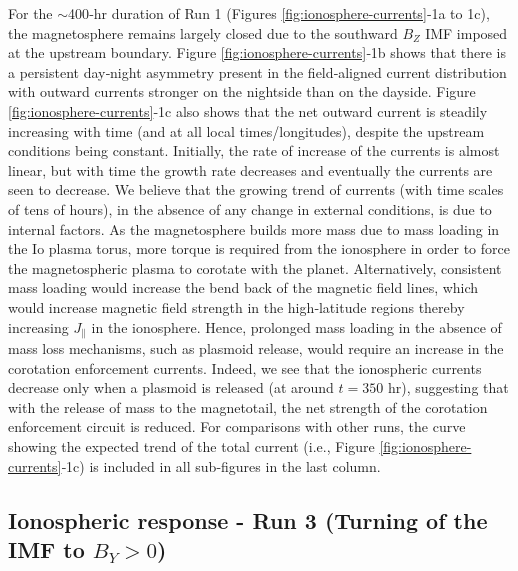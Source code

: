 For the $\sim$400‐hr duration of Run 1 (Figures \ref{fig:ionosphere-currents}‐1a to 1c), the magnetosphere remains largely closed due to the southward $B_Z$ IMF imposed at the upstream boundary. Figure \ref{fig:ionosphere-currents}‐1b shows that there is a persistent day‐night asymmetry present in the field‐aligned current distribution with outward currents stronger on the nightside than on the dayside. Figure \ref{fig:ionosphere-currents}‐1c also shows that the net outward current is steadily increasing with time (and at all local times/longitudes), despite the upstream conditions being constant. Initially, the rate of increase of the currents is almost linear, but with time the growth rate decreases and eventually the currents are seen to decrease. We believe that the growing trend of currents (with time scales of tens of hours), in the absence of any change in external conditions, is due to internal factors. As the magnetosphere builds more mass due to mass loading in the Io plasma torus, more torque is required from the ionosphere in order to force the magnetospheric plasma to corotate with the planet. Alternatively, consistent mass loading would increase the bend back of the magnetic field lines, which would increase magnetic field strength in the high‐latitude regions thereby increasing $J_\parallel$ in the ionosphere. Hence, prolonged mass loading in the absence of mass loss mechanisms, such as plasmoid release, would require an increase in the corotation enforcement currents. Indeed, we see that the ionospheric currents decrease only when a plasmoid is released (at around $t = 350$ hr), suggesting that with the release of mass to the magnetotail, the net strength of the corotation enforcement circuit is reduced. For comparisons with other runs, the curve showing the expected trend of the total current (i.e., Figure \ref{fig:ionosphere-currents}‐1c) is included in all sub-figures in the last column. 

\subsection{Ionospheric response - Run 3 (Turning of the IMF to \texorpdfstring{$B_Y > 0$}{By>0}) }


